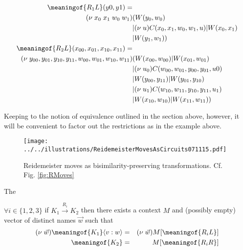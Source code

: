 \begin{align*}
  \meaningof{R_{1}L}(y0,y1) = & \\
  (\nu \; x_{0} \; x_{1} \; w_{0} \; w_{1} ) & (W(y_{0},w_{0}) \\
  & |(\nu \; u)C(x_{0},x_{1},w_{0},w_{1},u) | W(x_{0},x_{1}) \\
  & | W(y_{1},w_{1})) \\
  \meaningof{R_{2}L}(x_{00},x_{01},x_{10},x_{11}) = & \\
  (\nu \; y_{00},y_{01},y_{10},y_{11},w_{00},w_{01},w_{10},w_{11}) & (W(x_{00},w_{00}) | W(x_{01},w_{01}) \\
  & | (\nu \; u_{0})C(w_{00},w_{01},y_{00},y_{01},u{0}) \\
  & | W(y_{00},y_{11}) | W(y_{01},y_{10}) \\
  & | (\nu \; u_{1})C(w_{10},w_{11},y_{10},y_{11},u_1) \\
  & | W(x_{10},w_{10}) | W(x_{11},w_{11}))
\end{align*}

  Keeping to the notion of equivalence outlined in the section above,
  however, it will be convenient to factor out the restrictions as in
  the example above.

\begin{figure}[tbp]

\center\texttt{[image: ../../illustrations/ReidemeisterMovesAsCircuits071115.pdf]}  
\caption{ Reidemeister moves as bisimilarity-preserving transformations. Cf. Fig. \ref{fig:RMoves}}

\label{fig:RMovesAsXforms}
\end{figure}

The 

\begin{lemma}[context]
$\forall i \in \{ 1, 2, 3 \}$ if $K_{1} \stackrel{R_{i}}{\rightarrow}
K_{2}$ then there exists a context $M$ and (possibly empty) vector of
distinct names $\vec{w}$ such that
  \begin{eqnarray}
    (\nu \; \vec{w})\meaningof{K_{1}}\langle v:w\rangle & = & (\nu \; \vec{w})M[ \meaningof{R_{i}L} ] \nonumber \\
    \meaningof{K_{2}} & = & M[ \meaningof{R_{i}R} ] \nonumber
  \end{eqnarray}
\label{context}
\end{lemma}

